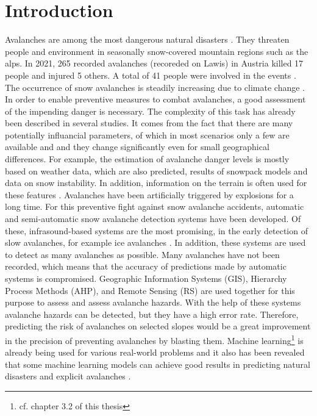 \documentclass[../masterarbeit.tex]{subfiles}
\begin{document}
	



\section{Introduction}
Avalanches are among the most dangerous natural disasters \textcite{Lawine:2019}. They threaten people and environment in seasonally snow-covered mountain regions such as the alps. In 2021, 265 recorded avalanches (recoreded on Lawis) in Austria killed 17 people and injured 5 others. A total of 41 people were involved in the events \textcite[]{Lawis:2022}. The occurrence of snow avalanches is steadily increasing due to climate change \textcite{Martin:2001} \textcite[]{Tiwari:2021} \textcite{Bahram:2019}.  In order to enable preventive measures to combat avalanches, a good assessment of the impending danger is necessary. The complexity of this task has already been described in several studies. It comes from the fact that there are many potentially influancial parameters, of which in most scenarios only a few are available and and they change significantly even for small geographical differences. For example, the estimation of avalanche danger levels is mostly based on weather data, which are also predicted, results of snowpack models and data on snow instability. In addition, information on the terrain is often used for these features \textcite{Bahram:2019}. Avalanches have been artificially triggered by explosions for a long time. For this preventive fight against snow avalanche accidents, automatic and semi-automatic snow avalanche detection systems have been developed. Of these, infrasound-based systems are the most promising, in the early detection of slow avalanches, for example ice avalanches \textcite{THURING201560} \textcite{Lawine:2019}. In addition, these systems are used to detect as many avalanches as possible. Many avalanches have not been recorded, which means that the accuracy of predictions made by automatic systems is compromised. Geographic Information Systems (GIS), Hierarchy Process Methods (AHP), and Remote Sensing (RS) are used together for this purpose to assess and assess avalanche hazards. With the help of these systems avalanche hazards can be detected, but they have a high error rate. Therefore, predicting the risk of avalanches on selected slopes would be a great improvement in the precision of preventing avalanches by blasting them. Machine learning\footnote{cf. chapter 3.2 of this thesis} is already being used for various real-world problems \textcite[]{SUBASI202091} and it also has been revealed that some machine learning models can achieve good results in predicting natural disasters and explicit avalanches \textcite[]{Martin:2001} \textcite[]{Tiwari:2021} \textcite{Bahram:2019}. 
\end{document}
